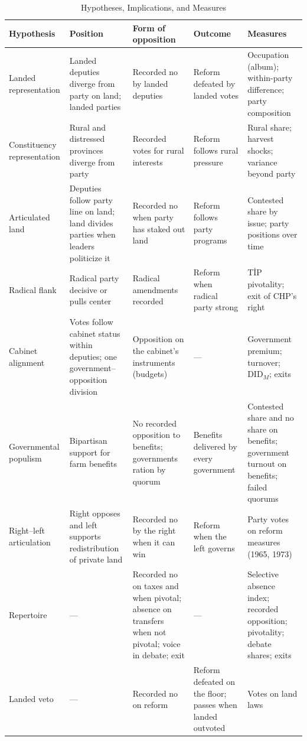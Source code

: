\documentclass[12pt]{article}
\begin{document}
\begin{table}[p]
\centering
\begin{threeparttable}
\caption{Hypotheses, Implications, and Measures}
\label{tab:hyp}
\footnotesize
\begin{tabular}{L{2.3cm}L{3.5cm}L{3.4cm}L{2.9cm}L{3.9cm}}
\toprule
Hypothesis & Position & Form of opposition & Outcome & Measures \\
\midrule
Landed representation & Landed deputies diverge from party on land; landed parties & Recorded no by landed deputies & Reform defeated by landed votes & Occupation (album); within-party difference; party composition \\
Constituency representation & Rural and distressed provinces diverge from party & Recorded votes for rural interests & Reform follows rural pressure & Rural share; harvest shocks; variance beyond party \\
Articulated land & Deputies follow party line on land; land divides parties when leaders politicize it & Recorded no when party has staked out land & Reform follows party programs & Contested share by issue; party positions over time \\
Radical flank & Radical party decisive or pulls center & Radical amendments recorded & Reform when radical party strong & TİP pivotality; exit of CHP's right \\
Cabinet alignment & Votes follow cabinet status within deputies; one government--opposition division & Opposition on the cabinet's instruments (budgets) & --- & Government premium; turnover; DID$_M$; exits \\
Governmental populism & Bipartisan support for farm benefits & No recorded opposition to benefits; governments ration by quorum & Benefits delivered by every government & Contested share and no share on benefits; government turnout on benefits; failed quorums \\
Right--left articulation & Right opposes and left supports redistribution of private land & Recorded no by the right when it can win & Reform when the left governs & Party votes on reform measures (1965, 1973) \\
Repertoire & --- & Recorded no on taxes and when pivotal; absence on transfers when not pivotal; voice in debate; exit & --- & Selective absence index; recorded opposition; pivotality; debate shares; exits \\
Landed veto & --- & Recorded no on reform & Reform defeated on the floor; passes when landed outvoted & Votes on land laws \\

\end{tabular}
\end{threeparttable}
\end{table}
\end{document}
